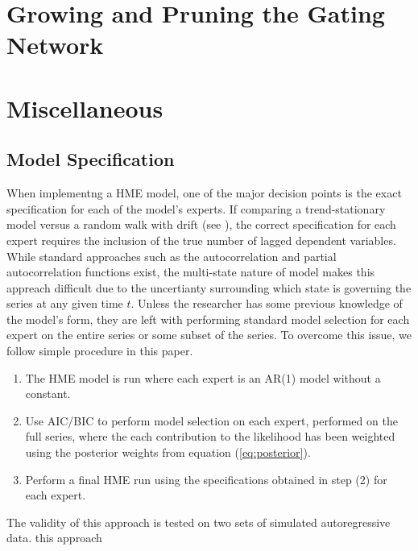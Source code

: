 \documentclass[12pt]{article}
\begin{document}
\section{Growing and Pruning the Gating Network} \label{sec:NetworkGrowth}



\section{Miscellaneous}



\subsection{Model Specification}
When implementng a HME model, one of the major decision points is the exact
specification for each of the model's experts. If comparing a trend-stationary
model versus a random walk with drift (see \cite{HuertaJiangTanner2003}), the
correct specification for each expert requires the inclusion of the true number
of lagged dependent variables. While standard approaches such as the autocorrelation
and partial autocorrelation functions exist, the multi-state nature of model makes
this appreach difficult due to the uncertianty surrounding which state is governing
the series at any given time $t$. Unless the researcher has some previous knowledge
of the model's form, they are left with performing standard model selection for
each expert on the entire series or some subset of the series. To overcome this
issue, we follow simple procedure in this paper.

\begin{enumerate}
\item The HME model is run where each expert is an AR(1) model without a constant.
\item Use AIC/BIC to perform model selection on each expert, performed on the full series, where the each contribution to the likelihood has been weighted using the posterior weights from equation (\ref{eq:posterior}).
\item Perform a final HME run using the specifications obtained in step (2) for each expert.
\end{enumerate}

The validity of this approach is tested on two sets of simulated autoregressive data. this approach
\end{document}
